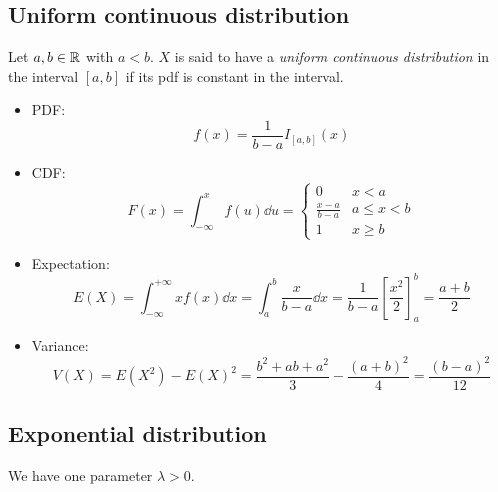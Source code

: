 \documentclass[12pt]{extarticle}
\begin{document}
\subsection{Uniform continuous distribution}

Let $a, b \in \mathbb{R}$ with $a < b$. $X$ is said to have a \emph{uniform continuous distribution} in the interval $[a, b]$ if its pdf is constant in the interval.

\begin{itemize}
    \item PDF:
          \begin{equation}
              \label{eq:uniform:pdf}
              f(x) = \frac{1}{b-a} I_{[a, b]}(x)
          \end{equation}
    \item CDF:
          \begin{equation}
              F(x) = \int_{-\infty}^x f(u) \dd{u} = \begin{cases}
                  0               & x < a        \\
                  \frac{x-a}{b-a} & a \leq x < b \\
                  1               & x \geq b
              \end{cases}
          \end{equation}
    \item Expectation:
          \begin{equation}
              E(X) = \int_{-\infty}^{+\infty} x f(x) \dd{x} = \int_a^b \frac{x}{b-a} \dd{x} = \frac{1}{b-a} \left[\frac{x^2}{2}\right]_a^b = \frac{a+b}{2}
          \end{equation}
    \item Variance:
          \begin{equation}
              V(X) = E(X^2) - E(X)^2 = \frac{b^2 + ab + a^2}{3} - \frac{(a+b)^2}{4} = \frac{(b-a)^2}{12}
          \end{equation}
\end{itemize}

\subsection{Exponential distribution}

We have one parameter $\lambda > 0$.
\end{document}
